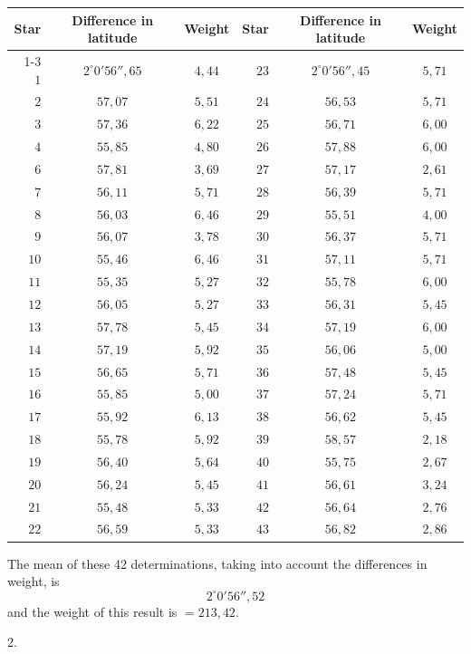 \begin{center}
{\small\setlength{\tabcolsep}{7pt}\renewcommand{\arraystretch}{1.05}
\begin{tabular}{r|c|c||r|c|c}
Star& Difference in latitude& Weight& Star& Difference in latitude& Weight\\
\cline{1-3}\cline{4-6}
$1$&$2^\circ0'56''{,}65$&$4{,}44$&$23$&$2^\circ0'56''{,}45$&$5{,}71$\\
$2$&$57{,}07$&$5{,}51$&$24$&$56{,}53$&$5{,}71$\\
$3$&$57{,}36$&$6{,}22$&$25$&$56{,}71$&$6{,}00$\\
$4$&$55{,}85$&$4{,}80$&$26$&$57{,}88$&$6{,}00$\\
$6$&$57{,}81$&$3{,}69$&$27$&$57{,}17$&$2{,}61$\\
$7$&$56{,}11$&$5{,}71$&$28$&$56{,}39$&$5{,}71$\\
$8$&$56{,}03$&$6{,}46$&$29$&$55{,}51$&$4{,}00$\\
$9$&$56{,}07$&$3{,}78$&$30$&$56{,}37$&$5{,}71$\\
$10$&$55{,}46$&$6{,}46$&$31$&$57{,}11$&$5{,}71$\\
$11$&$55{,}35$&$5{,}27$&$32$&$55{,}78$&$6{,}00$\\
$12$&$56{,}05$&$5{,}27$&$33$&$56{,}31$&$5{,}45$\\
$13$&$57{,}78$&$5{,}45$&$34$&$57{,}19$&$6{,}00$\\
$14$&$57{,}19$&$5{,}92$&$35$&$56{,}06$&$5{,}00$\\
$15$&$56{,}65$&$5{,}71$&$36$&$57{,}48$&$5{,}45$\\
$16$&$55{,}85$&$5{,}00$&$37$&$57{,}24$&$5{,}71$\\
$17$&$55{,}92$&$6{,}13$&$38$&$56{,}62$&$5{,}45$\\
$18$&$55{,}78$&$5{,}92$&$39$&$58{,}57$&$2{,}18$\\
$19$&$56{,}40$&$5{,}64$&$40$&$55{,}75$&$2{,}67$\\
$20$&$56{,}24$&$5{,}45$&$41$&$56{,}61$&$3{,}24$\\
$21$&$55{,}48$&$5{,}33$&$42$&$56{,}64$&$2{,}76$\\
$22$&$56{,}59$&$5{,}33$&$43$&$56{,}82$&$2{,}86$\\
\end{tabular}}
\end{center}

The mean of these 42 determinations, taking into account the differences
in weight, is
\[
2^\circ0'56''{,}52
\]
and the weight of this result is $=213{,}42$.

\begin{center}2.\end{center}

